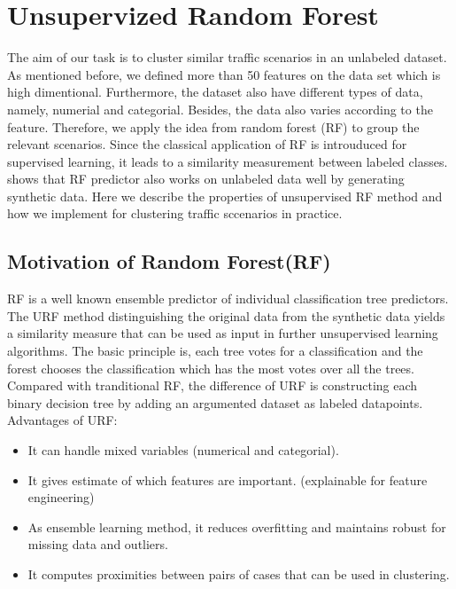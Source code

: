 \documentclass[conference]{IEEEtran}
\begin{document}
%


%

\section{Unsupervized Random Forest}
\label{section:forest}
The aim of our task is to cluster similar traffic scenarios in an unlabeled dataset. 
As mentioned before, we defined more than 50 features on the data set which is high dimentional.
Furthermore, the dataset also have different types of data, namely, numerial and categorial. 
Besides, the data also varies according to the feature. Therefore, we apply the idea from random forest (RF) to group the relevant scenarios.
Since the classical application of RF is introuduced for supervised learning, it leads to a similarity measurement between labeled classes.
\cite{shi2006unsupervised} shows that RF predictor also works on unlabeled data well by generating synthetic data. Here we describe the properties of unsupervised RF method and how we implement 
for clustering traffic sccenarios in practice.
\subsection{Motivation of Random Forest(RF)}
RF is a well known ensemble predictor of individual classification tree predictors. The URF method distinguishing the original data from the synthetic data yields a similarity
measure that can be used as input in further unsupervised learning algorithms. The basic principle is, each tree votes for a classification and the forest chooses the classification which has the most votes over all the trees.
Compared with tranditional RF, the difference of URF is constructing each binary decision tree by adding an argumented dataset as labeled datapoints.
Advantages of URF:
\begin{itemize}
  \item It can handle mixed variables (numerical and categorial).
  \item It gives estimate of which features are important. (explainable for feature engineering)
  \item As ensemble learning method, it reduces overfitting and maintains robust for missing data and outliers.
  \item It computes proximities between pairs of cases that can be used in clustering.
  \end{itemize}
\end{document}
